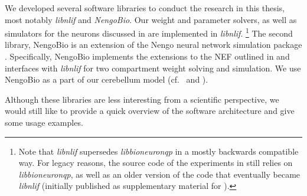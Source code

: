
We developed several software libraries to conduct the research in this thesis, most notably \emph{libnlif} and \emph{NengoBio}.
Our weight and parameter solvers, as well as simulators for the \nlif neurons discussed in  are implemented in \emph{libnlif}.%
\footnote{
Note that \emph{libnlif} supersedes \emph{libbioneuronqp} in a mostly backwards compatible way.
For legacy reasons, the source code of the experiments in  still relies on \emph{libbioneuronqp}, as well as an older version of the code that eventually became \emph{libnlif} (initially published as supplementary material for \cite{stoeckel2021}).
}
The second library, NengoBio is an extension of the Nengo neural network simulation package \citep{bekolay2014nengo}.
Specifically, NengoBio implements the extensions to the NEF outlined in  and interfaces with \emph{libnlif} for two compartment weight solving and simulation.
We use NengoBio as a part of our cerebellum model (cf.~ and \cite{stockel2021connecting}).

Although these libraries are less interesting from a scientific perspective, we would still like to provide a quick overview of the software architecture and give some usage examples.